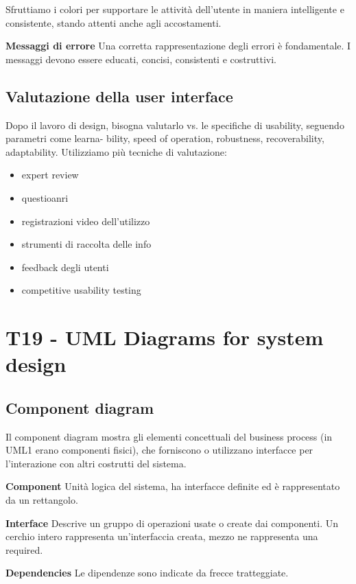 \documentclass{article}
\begin{document}
Sfruttiamo i colori per supportare le
attività dell'utente in maniera intelligente e consistente, stando attenti anche agli accostamenti.




\textbf{Messaggi di errore} Una corretta rappresentazione degli errori è fondamentale. I messaggi devono essere
educati, concisi, consistenti e costruttivi.


\subsection{Valutazione della user interface}
Dopo il lavoro di design, bisogna valutarlo vs. le specifiche di usability, seguendo parametri come learna-
bility, speed of operation, robustness, recoverability, adaptability. Utilizziamo più tecniche di valutazione:
\begin{itemize}
    \item expert review
    \item questioanri
    \item registrazioni video dell'utilizzo
    \item strumenti di raccolta delle info
    \item feedback degli utenti
    \item competitive usability testing
\end{itemize}

\section{T19 - UML Diagrams for system design}

\subsection{Component diagram}
Il component diagram mostra gli elementi concettuali del business process (in UML1 erano componenti
fisici), che forniscono o utilizzano interfacce per l'interazione con altri costrutti del sistema.




\textbf{Component} Unità logica del sistema, ha interfacce definite ed è rappresentato da un rettangolo.

\textbf{Interface} Descrive un gruppo di operazioni usate o create dai componenti. Un cerchio intero rappresenta
un'interfaccia creata, mezzo ne rappresenta una required.

\textbf{Dependencies} Le dipendenze sono indicate da frecce tratteggiate.
\end{document}
